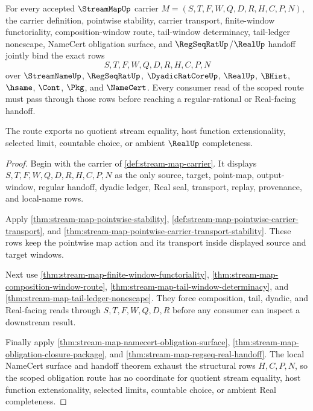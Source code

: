 \begin{theorem}
\label{thm:stream-map-scoped-obligation-route}
For every accepted $\StreamMapUp$ carrier $M=(S,T,F,W,Q,D,R,H,C,P,N)$, the carrier definition, pointwise stability, carrier transport, finite-window functoriality, composition-window route, tail-window determinacy, tail-ledger nonescape, NameCert obligation surface, and $\RegSeqRatUp$/$\RealUp$ handoff jointly bind the exact rows
$$
S,T,F,W,Q,D,R,H,C,P,N
$$
over $\StreamNameUp$, $\RegSeqRatUp$, $\DyadicRatCoreUp$, $\RealUp$, $\BHist$, $\hsame$, $\Cont$, $\Pkg$, and $\NameCert$. Every consumer read of the scoped route must pass through those rows before reaching a regular-rational or Real-facing handoff.

The route exports no quotient stream equality, host function extensionality, selected limit, countable choice, or ambient $\RealUp$ completeness.
\end{theorem}
\begin{proof}
Begin with the carrier of \autoref{def:stream-map-carrier}. It displays $S,T,F,W,Q,D,R,H,C,P,N$ as the only source, target, point-map, output-window, regular handoff, dyadic ledger, Real seal, transport, replay, provenance, and local-name rows.

Apply \autoref{thm:stream-map-pointwise-stability}, \autoref{def:stream-map-pointwise-carrier-transport}, and \autoref{thm:stream-map-pointwise-carrier-transport-stability}. These rows keep the pointwise map action and its transport inside displayed source and target windows.

Next use \autoref{thm:stream-map-finite-window-functoriality}, \autoref{thm:stream-map-composition-window-route}, \autoref{thm:stream-map-tail-window-determinacy}, and \autoref{thm:stream-map-tail-ledger-nonescape}. They force composition, tail, dyadic, and Real-facing reads through $S,T,F,W,Q,D,R$ before any consumer can inspect a downstream result.

Finally apply \autoref{thm:stream-map-namecert-obligation-surface}, \autoref{thm:stream-map-obligation-closure-package}, and \autoref{thm:stream-map-regseq-real-handoff}. The local NameCert surface and handoff theorem exhaust the structural rows $H,C,P,N$, so the scoped obligation route has no coordinate for quotient stream equality, host function extensionality, selected limits, countable choice, or ambient Real completeness.
\end{proof}

